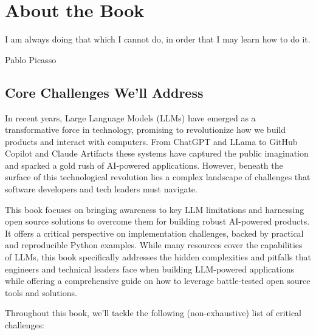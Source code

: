 \setchapterpreamble[u]{\margintoc}

\chapter{About the Book}

\epigraph{I am always doing that which I cannot do, in order that I may learn how to do it.}{Pablo Picasso}

\section{Core Challenges We'll Address}

In recent years, Large Language Models (LLMs) have emerged as a transformative force in technology, promising to revolutionize how we build products and interact with computers. From ChatGPT and LLama to GitHub Copilot and Claude Artifacts these systems have captured the public imagination and sparked a gold rush of AI-powered applications. However, beneath the surface of this technological revolution lies a complex landscape of challenges that software developers and tech leaders must navigate. 

This book focuses on bringing awareness to key LLM limitations and harnessing open source solutions to overcome them for building robust AI-powered products. It offers a critical perspective on implementation challenges, backed by practical and reproducible Python examples. While many resources cover the capabilities of LLMs, this book specifically addresses the hidden complexities and pitfalls that engineers and technical leaders face when building LLM-powered applications while offering a comprehensive guide on how to leverage battle-tested open source tools and solutions.

Throughout this book, we'll tackle the following (non-exhaustive) list of critical challenges:

